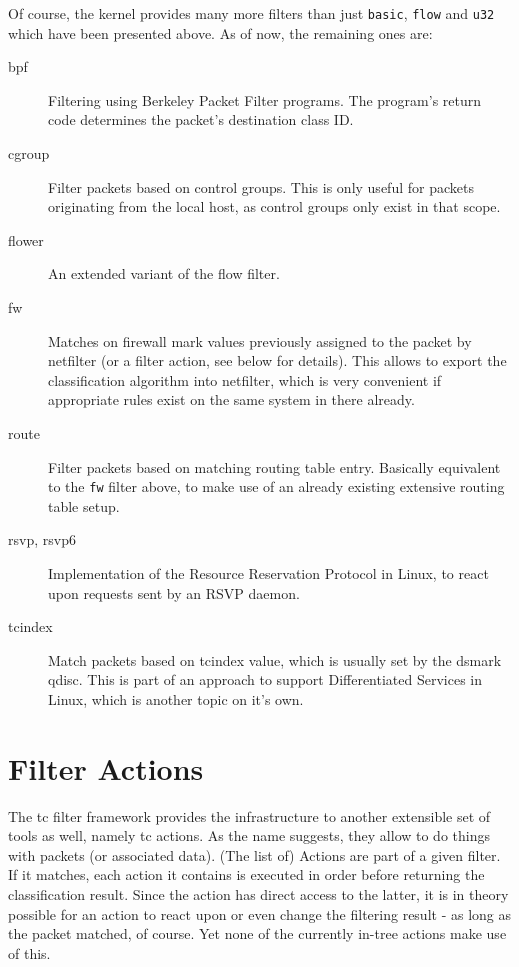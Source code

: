 \documentclass[12pt,twoside]{article}
\newcommand{\filter}{\texttt}
\begin{document}
Of course, the kernel provides many more filters than just \filter{basic},
\filter{flow} and \filter{u32} which have been presented above. As of now, the
remaining ones are:
\begin{description}
\item[bpf]
        Filtering using Berkeley Packet Filter programs. The program's return
        code determines the packet's destination class ID.

\item[cgroup]
        Filter packets based on control groups. This is only useful for packets
        originating from the local host, as control groups only exist in that
        scope.

\item[flower]
        An extended variant of the flow filter.

\item[fw]
        Matches on firewall mark values previously assigned to the packet by
        netfilter (or a filter action, see below for details). This allows to
        export the classification algorithm into netfilter, which is very
        convenient if appropriate rules exist on the same system in there
        already.

\item[route]
        Filter packets based on matching routing table entry. Basically
        equivalent to the \texttt{fw} filter above, to make use of an already existing
        extensive routing table setup.

\item[rsvp, rsvp6]
        Implementation of the Resource Reservation Protocol in Linux, to react
        upon requests sent by an RSVP daemon.

\item[tcindex]
        Match packets based on tcindex value, which is usually set by the dsmark
        qdisc. This is part of an approach to support Differentiated Services in
        Linux, which is another topic on it's own.
\end{description}


\section*{Filter Actions}

The tc filter framework provides the infrastructure to another extensible set of
tools as well, namely tc actions. As the name suggests, they allow to do things
with packets (or associated data). (The list of) Actions are part of a given
filter. If it matches, each action it contains is executed in order before
returning the classification result. Since the action has direct access to the
latter, it is in theory possible for an action to react upon or even change the
filtering result - as long as the packet matched, of course. Yet none of the
currently in-tree actions make use of this.
\end{document}
